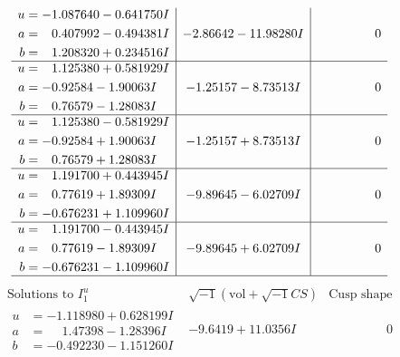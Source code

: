 \documentclass[1p]{elsarticle_modified}
\theoremstyle{definition}
\newcommand{\I}{\sqrt{-1}}
\begin{document}
$$\begin{array}{c|c|c}
\begin{aligned}
u &= -1.087640 - 0.641750 I \\
a &= \phantom{-}0.407992 - 0.494381 I \\
b &= \phantom{-}1.208320 + 0.234516 I\end{aligned}
 & -2.86642 - 11.98280 I & \phantom{-0.000000 } 0 \\ \hline\begin{aligned}
u &= \phantom{-}1.125380 + 0.581929 I \\
a &= -0.92584 - 1.90063 I \\
b &= \phantom{-}0.76579 - 1.28083 I\end{aligned}
 & -1.25157 - 8.73513 I & \phantom{-0.000000 } 0 \\ \hline\begin{aligned}
u &= \phantom{-}1.125380 - 0.581929 I \\
a &= -0.92584 + 1.90063 I \\
b &= \phantom{-}0.76579 + 1.28083 I\end{aligned}
 & -1.25157 + 8.73513 I & \phantom{-0.000000 } 0 \\ \hline\begin{aligned}
u &= \phantom{-}1.191700 + 0.443945 I \\
a &= \phantom{-}0.77619 + 1.89309 I \\
b &= -0.676231 + 1.109960 I\end{aligned}
 & -9.89645 - 6.02709 I & \phantom{-0.000000 } 0 \\ \hline\begin{aligned}
u &= \phantom{-}1.191700 - 0.443945 I \\
a &= \phantom{-}0.77619 - 1.89309 I \\
b &= -0.676231 - 1.109960 I\end{aligned}
 & -9.89645 + 6.02709 I & \phantom{-0.000000 } 0\\
 \hline 
 \end{array}$$\newpage$$\begin{array}{c|c|c}  
\text{Solutions to }I^u_{1}& \I (\text{vol} + \sqrt{-1}CS) & \text{Cusp shape}\\
 \hline 
\begin{aligned}
u &= -1.118980 + 0.628199 I \\
a &= \phantom{-}1.47398 - 1.28396 I \\
b &= -0.492230 - 1.151260 I\end{aligned}
 & -9.6419 + 11.0356 I & \phantom{-0.000000 } 0 \\ \hline\begin{aligned}

\end{aligned}
\end{array}$$
\end{document}
